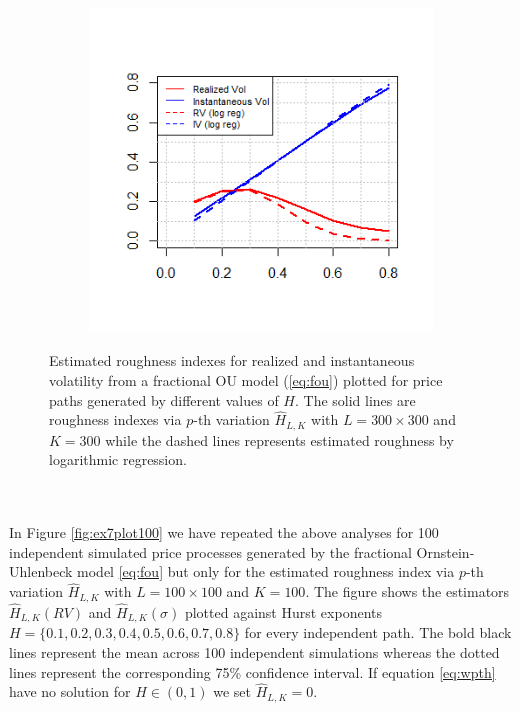 \documentclass{article}
\begin{document}
\begin{figure}[htbp]
    \centering
    
    \begin{subfigure}{0.78\textwidth}
        \includegraphics[width=\linewidth]{ex7_single_plot.png}
    \end{subfigure}
    
    \caption{Estimated roughness indexes for realized and instantaneous volatility from a fractional OU model (\ref{eq:fou}) plotted for price paths generated by different values of $H$. The solid lines are roughness indexes via $p$-th variation $\widehat{H}_{L,K}$ with $L = 300\times 300$ and $K= 300$ while the dashed lines represents estimated roughness by logarithmic regression.}
    \label{fig:ex7single}
\end{figure}\\\\
In Figure \ref{fig:ex7plot100} we have repeated the above analyses for 100 independent simulated price processes generated by the fractional Ornstein-Uhlenbeck model \eqref{eq:fou} but only for the estimated roughness index via $p$-th variation $\widehat{H}_{L,K}$ with $L = 100\times 100$ and $K= 100$. The figure shows the estimators $\widehat{H}_{L,K}(RV)$ and $\widehat{H}_{L,K}(\sigma)$ plotted against Hurst exponents $H=\{0.1,0.2,0.3,0.4,0.5,0.6,0.7,0.8\}$ for every independent path. The bold black lines represent the mean across 100 independent simulations whereas the dotted lines represent the corresponding 75\% confidence interval. If equation \eqref{eq:wpth} have no solution for $H\in (0,1)$ we set $\widehat{H}_{L,K}=0$.
\end{document}
